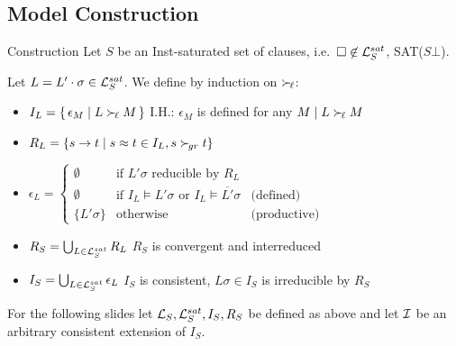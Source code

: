 \documentclass[%
handout,
]{beamer}
\begin{document}
\subsection{Model Construction}
\begin{frame}{Construction}
    Let $S$ be an Inst-saturated set of clauses,
    i.e.~$\square\not\in\mathcal{L}_S^{sat}$, SAT($S\bot$).
    \vspace{0.7em}

    Let $L = L'\cdot\sigma \in\mathcal{L}_S^{sat}$.
    We define by induction on $\mathrel\succ_{\!\ell}$:

        \begin{itemize}
            \item $I_L = \{\,\epsilon_M\mid L\mathrel\succ_{\!\ell} M\,\}$
            \hfill I.H.: $\epsilon_M$ is defined for any $M\mid L\mathrel\succ_{\!\ell} M$

            \item $R_L = \{ s \to t \mid s\approx t\in I_L, s\mathrel\succ_{\!gr} t \}$

                \item $\epsilon_L = \left\{
                    \begin{array}{cll}
                        \emptyset &\text{if }
                        L'\sigma\text{ reducible by }R_L
                        \\
                        \emptyset &\text{if }
                        I_L\vDash L'\sigma
                        \text{ or }
                        I_L\vDash \overline{L'}\sigma
                        &\text{(defined)}
                        \\
                        \{ L'\sigma \}
                        &\text{otherwise}
                        &\text{(productive)}
                    \end{array}
                \right.$
                \vspace{0.7em}
            \item
            $R_S = \bigcup_{L\in\mathcal{L}_S^{sat}} R_L$
            \hfill
            $R_S$ is convergent and interreduced

            \vspace{0.7em}
            \item
            $I_S = \bigcup_{L\in\mathcal{L}_S^{sat}} \epsilon_L$
            \hfill
            $I_S$ is consistent,
            $L\sigma\in I_S$ is irreducible by $R_S$
        \end{itemize}

        For the following slides let $\mathcal{L}_S,\mathcal{L}_S^{sat}, I_S, R_S$ be defined as above
        and let $\mathcal{I}$ be an arbitrary consistent extension of $I_S$.
\end{frame}
\end{document}
